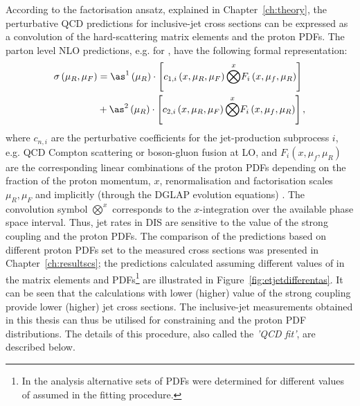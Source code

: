 According to the factorisation ansatz, explained in Chapter~\ref{ch:theory}, the perturbative QCD predictions for inclusive-jet cross sections can be expressed as a convolution of the hard-scattering matrix elements and the proton PDFs. The parton level NLO predictions, e.g. for \dsdetjetb, have the following formal representation:
\begin{equation}
	\begin{split}
\sigma\left( \mu_R, \mu_F\right)  &= \as^1\left( \mu_R\right) \cdot \left[ c_{1,i}\left( x, \mu_R, \mu_F\right) \overset{x}{\bigotimes } F_i\left( x, \mu_f, \mu_R \right) \right] \\
&+ \as^2\left( \mu_R\right) \cdot \left[ c_{2,i}\left( x, \mu_R, \mu_F\right) \overset{x}{\bigotimes } F_i\left( x, \mu_f, \mu_R \right) \right],
	\end{split}
	\label{eq:fitnloqcdpredictions}
\end{equation}
where $c_{n,i}$ are the perturbative coefficients for the jet-production subprocess $i$, e.g. QCD Compton scattering or boson-gluon fusion at LO, and $F_i\left( x, \mu_f, \mu_R \right)$ are the corresponding linear combinations of the proton PDFs depending on the fraction of the proton momentum, $x$, renormalisation and factorisation scales $\mu_R, \mu_F$ and implicitly (through the DGLAP evolution equations) \as. The convolution symbol $\overset{x}{\bigotimes}$ corresponds to the $x$-integration over the available phase space interval. Thus, jet rates in DIS are sensitive to the value of the strong coupling and the proton PDFs. The comparison of the predictions based on different proton PDFs set to the measured cross sections was presented in Chapter~\ref{ch:resultscs}; the predictions calculated assuming different values of \asz in the matrix elements and PDFs\footnote{In the  analysis alternative sets of PDFs were determined for different values of \asz assumed in the fitting procedure.} are illustrated in Figure~\ref{fig:etjetdifferentas}. It can be seen that the calculations with lower (higher) value of the strong coupling provide lower (higher) jet cross sections. %
The inclusive-jet measurements obtained in this thesis can thus be utilised for constraining \as and the proton PDF distributions. The details of this procedure, also called the \emph{'QCD fit'}, are described below.



